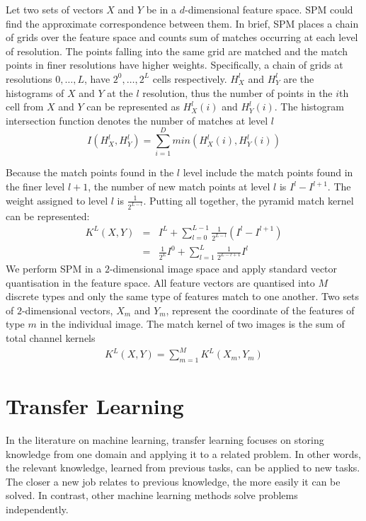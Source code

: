 Let two sets of vectors $X$ and $Y$ be in a $d$-dimensional feature space. SPM could find the approximate correspondence between them. In brief, SPM places a chain of grids over the feature space and counts sum of matches occurring at each level of resolution. The points falling into the same grid are matched and the match points in finer resolutions have higher weights. Specifically, a chain of grids at resolutions $0,\dotso,L$, have $2^0,\dotso,2^L$ cells respectively. $H_{X}^l$ and $H_{Y}^l$ are the histograms of $X$ and $Y$ at the $l$ resolution, thus the number of points in the $i$th cell from $X$ and $Y$ can be represented as $H_{X}^l(i)$ and $H_{Y}^l(i)$. The histogram intersection function denotes the number of matches at level $l$
\begin{equation}\label{eq:HistInterFunc}
I(H_{X}^l, H_{Y}^l) = \sum_{i=1}^D min(H_{X}^l(i), H_{Y}^l(i))
\end{equation}

Because the match points found in the $l$ level include the match points found in the finer level $l+1$, the number of new match points at level $l$ is $I^l - I^{l+1}$. The weight assigned to level $l$ is $\frac{1}{2^{L-l}}$. Putting all together, the pyramid match kernel can be represented:
\begin{eqnarray}\label{eq:PyramidChanMatchKernel}
  K^L(X,Y) & = & I^L + \sum_{l=0}^{L-1} \frac{1}{2^{L-l}}(I^l-I^{l+1})\\
 & = & \frac{1}{2^L}I^0 + \sum_{l=1}^{L}\frac{1}{2^{L-l+1}}I^l
\end{eqnarray}
We perform SPM in a $2$-dimensional image space and apply standard vector quantisation in the feature space. All feature vectors are quantised into $M$ discrete types and only the same type of features match to one another. Two sets of $2$-dimensional vectors, $X_m$ and $Y_m$, represent the coordinate of the features of type $m$ in the individual image. The match kernel of two images is the sum of total channel kernels
\begin{eqnarray}\label{eq:PyramidMatchKernel}
  K^L(X,Y) = \sum_{m=1}^{M} K^L(X_m, Y_m)
\end{eqnarray}

\section{Transfer Learning}

In the literature on machine learning, transfer learning \citep{pan2010survey} focuses on storing knowledge from one domain and applying it to a related problem. In other words, the relevant knowledge, learned from previous tasks, can be applied to new tasks. The closer a new job relates to previous knowledge, the more easily it can be solved. In contrast, other machine learning methods solve problems independently. 

